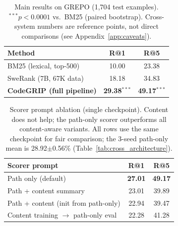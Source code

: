 \documentclass{article}
\begin{document}
\begin{table}[h]
\centering
\caption{Main results on GREPO (1,704 test examples). $^{***}p < 0.0001$ vs.\ BM25 (paired bootstrap). Cross-system numbers are reference points, not direct comparisons (see Appendix~\ref{app:caveats}).}
\label{tab:main}
\small
\begin{tabular}{lcc}
\toprule
\textbf{Method} & \textbf{R@1} & \textbf{R@5} \\
\midrule
BM25 (lexical, top-500) & 10.00 & 23.38 \\
SweRank (7B, 67K data) & 18.18 & 34.83 \\
\textbf{CodeGRIP (full pipeline)} & \textbf{29.38}$^{***}$ & \textbf{49.17}$^{***}$ \\
\bottomrule
\end{tabular}
\end{table}

\begin{table}[h]
\centering
\caption{Scorer prompt ablation (single checkpoint). Content does not help; the path-only scorer outperforms all content-aware variants. All rows use the same checkpoint for fair comparison; the 3-seed path-only mean is 28.92$\pm$0.56\% (Table~\ref{tab:cross_architecture}).}
\label{tab:content_ablation}
\small
\begin{tabular}{lcc}
\toprule
\textbf{Scorer prompt} & \textbf{R@1} & \textbf{R@5} \\
\midrule
Path only (default) & \textbf{27.01} & \textbf{49.17} \\
Path + content summary & 23.01 & 39.89 \\
Path + content (init from path-only) & 22.94 & 39.47 \\
Content training $\to$ path-only eval & 22.28 & 41.28 \\
\bottomrule
\end{tabular}
\end{table}
\end{document}
